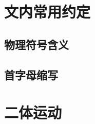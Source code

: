
\chapter{文内常用约定} \label{apdx:nomenclature}

\section{物理符号含义} \label{apdx:symbol}

\section{首字母缩写} \label{apdx:acronym}


\chapter{二体运动} \label{apdx:twobodyproblem}




